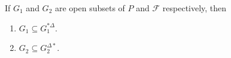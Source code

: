 If $G_1$ and $G_2$ are open subsets of $P$ and $\mathcal{F}$ respectively, then
\begin{enumerate}
\item $G_1 \subseteq G_1^{*\Delta}$.
\item $G_2 \subseteq G_2^{\Delta *}$.
\end{enumerate}

